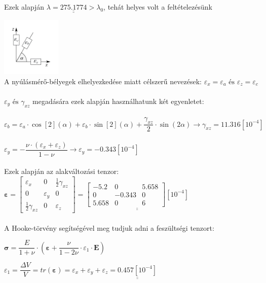 \documentclass[10pt, a4paper]{article}
\newcommand{\negy}{\begin{trivlist}\item[\hskip \labelsep {\bfseries 
			{4. Feladat:}}]\end{trivlist}}
\newcommand{\minegy}{\mathrm{\left[10^{-4}\right]}}
\begin{document}
	Ezek alapján $\lambda = \underline{\underline{275.1774}} > \lambda_0$, tehát helyes volt a feltételezésünk
	\negy
	\includegraphics[width=80pt]{epsilonabra.png}\\
	A nyúlásmérő-bélyegek elhelyezkedése miatt célszerű nevezések: $\varepsilon_x = \varepsilon_a \text{ és } \varepsilon_z = \varepsilon_c$\\\\
	$\varepsilon_y \text{ és } \gamma_{xz}$ megadására ezek alapján használhatunk két egyenletet:\\\\
	$\varepsilon_b = \varepsilon_a \cdot \cos[2](\alpha) + \varepsilon_b \cdot \sin[2](\alpha) + \dfrac{\gamma_{xz}}{2} \cdot \sin(2\alpha) \xrightarrow{} \gamma_{xz} = 11.316 \minegy$\\\\
	$\varepsilon_y = -\dfrac{\nu \cdot (\varepsilon_x + \varepsilon_z)}{1 - \nu} \xrightarrow{} \varepsilon_y = -0.343 \minegy$\\\\
	Ezek alapján az alakváltozási tenzor: $\boldsymbol{\varepsilon} = 
	\begin{bmatrix}
		\varepsilon_x & 0 & \frac{1}{2}\gamma_{xz}\\
		0 & \varepsilon_y & 0\\
		\frac{1}{2}\gamma_{xz} & 0 & \varepsilon_z
	\end{bmatrix} = 
	\underline{\underline{\begin{bmatrix}
	-5.2 & 0 & 5.658\\
	0 & -0.343 & 0\\
	5.658 & 0 & 6
	\end{bmatrix} \minegy}}$\\\\
	A Hooke-törvény segítségével meg tudjuk adni a feszültségi tenzort:
	\begin{center}
		$\boldsymbol{\sigma} = \dfrac{E}{1 + \nu} \cdot \left( \boldsymbol{\varepsilon} + \dfrac{\nu}{1 - 2\nu} \cdot \varepsilon_1 \cdot \textbf{E} \right)$
	\end{center}
	$\varepsilon_1 = \dfrac{\Delta V}{V} = tr(\boldsymbol{\varepsilon}) = \varepsilon_x + \varepsilon_y + \varepsilon_z = \underline{\underline{0.457 \minegy}}$\\\\
\end{document}

